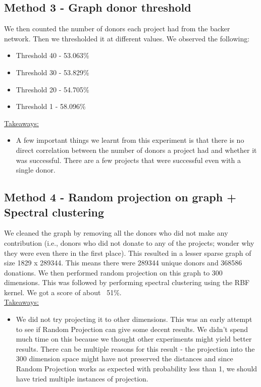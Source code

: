 \documentclass{article}
\begin{document}
\subsection*{Method 3 - Graph donor threshold}
We then counted the number of donors each project had from the backer network. Then we thresholded it at different values. We observed the following: \\
\begin{itemize}
\item Threshold 40 - 53.063\%
\item Threshold 30 - 53.829\%
\item Threshold 20 - 54.705\%
\item Threshold 1 - 58.096\%
\end{itemize}
\newpage
\underline{Takeaways:}\\
\vspace{-0.5cm}
\begin{itemize}
\item A few important things we learnt from this experiment is that there is no direct correlation between the number of donors a project had and whether it was successful. 
There are a few projects that were successful even with a single donor. 
\end{itemize}

\subsection*{Method 4 -  Random projection on graph + Spectral clustering}
We cleaned the graph by removing all the donors who did not make any contribution (i.e., donors who did not donate to any of the projects; wonder why they were even there in the first place). This resulted in a lesser sparse graph of size 1829 x 289344. This means there were 289344 unique donors and 368586 donations. We then performed random projection on this graph to 300 dimensions. This was followed by performing spectral clustering using the RBF kernel. We got a score of about ~51\%. \\
\underline{Takeaways:}\\
\vspace{-0.5cm}
\begin{itemize}
\item We did not try projecting it to other dimensions. This was an early attempt to see if Random Projection can give some decent results. We didn’t spend much time on this because we thought other experiments might yield better results. There can be multiple reasons for this result - the projection into the 300 dimension space might have not preserved the distances and since Random Projection works as expected with probability less than 1, we should have tried multiple instances of projection. 
\end{itemize}
\end{document}
